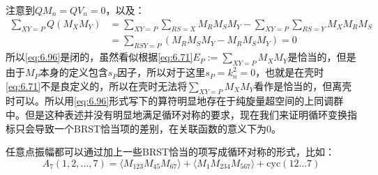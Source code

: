 注意到$QM_n=QV_n=0$，以及：
\begin{equation}
	\begin{aligned}
		\sum_{XY=P}Q(M_XM_Y)&=\sum_{XY=P}\sum_{RS=X}M_RM_SM_Y-\sum_{XY=P}\sum_{RS=Y}M_XM_RM_S\\&=\sum_{RSY=P}\left(M_RM_SM_Y-M_RM_SM_Y\right)=0
	\end{aligned}
\end{equation}
所以\ref{eq:6.96}是闭的，虽然看似根据\ref{eq:6.71}$E_P:=\sum_{XY=P}M_XM_Y$是恰当的，但是由于$M_P$本身的定义包含$s_P$因子，所以对于这里$s_P=k_n^2=0$，也就是在壳时\ref{eq:6.71}不是良定义的，所以在壳时无法将$\sum_{XY=P}M_XM_Y$看作是恰当的，但离壳时可以。所以用\ref{eq:6.96}形式写下的算符明显地存在于纯旋量超空间的上同调群中。但是这种表述并没有明显地满足循环对称的要求，现在我们来证明循环变换指标只会导致一个BRST恰当项的差别，在关联函数的意义下为$0$。



任意点振幅都可以通过加上一些BRST恰当的项写成循环对称的形式，比如：
\begin{equation}
	A_7(1,2,\ldots,7)=\langle M_{123}M_{45}M_{67}\rangle+\langle M_1M_{234}M_{567}\rangle+\mathrm{cyc}(12\ldots7)
\end{equation}

